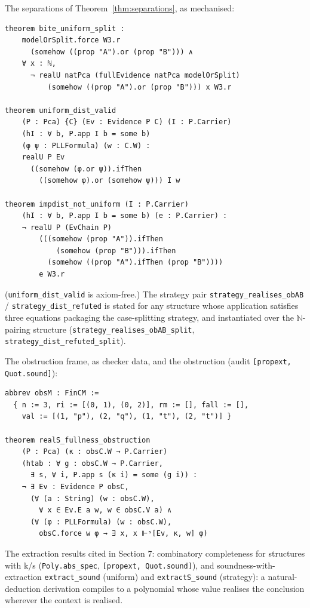 The separations of Theorem~\ref{thm:separations}, as mechanised:

\begin{lstlisting}
theorem bite_uniform_split :
    modelOrSplit.force W3.r
      (somehow ((prop "A").or (prop "B"))) ∧
    ∀ x : ℕ,
      ¬ realU natPca (fullEvidence natPca modelOrSplit)
          (somehow ((prop "A").or (prop "B"))) x W3.r

theorem uniform_dist_valid
    (P : Pca) {C} (Ev : Evidence P C) (I : P.Carrier)
    (hI : ∀ b, P.app I b = some b)
    (φ ψ : PLLFormula) (w : C.W) :
    realU P Ev
      ((somehow (φ.or ψ)).ifThen
        ((somehow φ).or (somehow ψ))) I w

theorem impdist_not_uniform (I : P.Carrier)
    (hI : ∀ b, P.app I b = some b) (e : P.Carrier) :
    ¬ realU P (EvChain P)
        (((somehow (prop "A")).ifThen
            (somehow (prop "B"))).ifThen
          (somehow ((prop "A").ifThen (prop "B"))))
        e W3.r
\end{lstlisting}

\noindent (\texttt{uniform\_dist\_valid} is axiom-free.) The strategy
pair \texttt{strategy\_realises\_obAB} / \texttt{strategy\_dist\_refuted}
is stated for any structure whose application satisfies three equations
packaging the case-splitting strategy, and instantiated over the
\ensuremath{\mathbb{N}}-pairing structure
(\texttt{strategy\_realises\_obAB\_split},
\texttt{strategy\_dist\_refuted\_split}).

The obstruction frame, as checker data, and the obstruction
(audit \texttt{[propext, Quot.sound]}):

\begin{lstlisting}
abbrev obsM : FinCM :=
  { n := 3, ri := [(0, 1), (0, 2)], rm := [], fall := [],
    val := [(1, "p"), (2, "q"), (1, "t"), (2, "t")] }

theorem realS_fullness_obstruction
    (P : Pca) (κ : obsC.W → P.Carrier)
    (htab : ∀ g : obsC.W → P.Carrier,
      ∃ s, ∀ i, P.app s (κ i) = some (g i)) :
    ¬ ∃ Ev : Evidence P obsC,
      (∀ (a : String) (w : obsC.W),
        ∀ x ∈ Ev.E a w, w ∈ obsC.V a) ∧
      (∀ (φ : PLLFormula) (w : obsC.W),
        obsC.force w φ → ∃ x, x ⊩ˢ[Ev, κ, w] φ)
\end{lstlisting}

The extraction results cited in Section 7: combinatory completeness for
structures with k/s (\texttt{Poly.abs\_spec},
\texttt{[propext, Quot.sound]}), and soundness-with-extraction
\texttt{extract\_sound} (uniform) and \texttt{extractS\_sound}
(strategy): a natural-deduction derivation compiles to a polynomial
whose value realises the conclusion wherever the context is realised.

